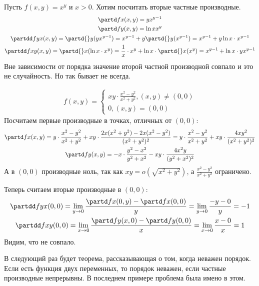 \begin{exmp}
  Пусть $f(x, y) = x^y$ и $x>0$.
  Хотим посчитать вторые частные производные.
	\begin{gather*}
	\partd f x (x, y) = yx^{y-1} \\
	\partd f y (x, y) = \ln x x^y \\
	\partdd f y x (x, y) = \partd{}y(yx^{y-1}) = x^{y-1}+y\partd{}y(x^{y-1}) = x^{y-1}+y\ln x \cdot x^{y-1} \\
	\partdd f x y (x, y) = \partd{}x(\ln x \cdot x^y) = \frac 1 x \cdot x^y + \ln x \cdot \partd{}x(x^y) = x^{y-1}+\ln x \cdot yx^{y-1}
	\end{gather*}
	Вне зависимости от порядка значение второй частной производной совпало и это не случайность.
	Но так бывает не всегда.
\end{exmp}
\begin{exmp}
	\begin{gather*}
	f(x, y) =
		\begin{cases}
			xy \cdot \frac{x^2-y^2}{x^2+y^2}, (x, y) \ne (0, 0) \\
			0, (x, y) = (0, 0)
		\end{cases}
	\end{gather*}
	Посчитаем первые производные в точках, отличных от $(0, 0)$:
	\begin{gather*}
	\partd f x (x, y) = y \cdot \frac{x^2-y^2}{x^2+y^2} + xy \cdot \frac{2x(x^2+y^2)-2x(x^2-y^2)}{(x^2+y^2)^2}
	                  = y \cdot \frac{x^2-y^2}{x^2+y^2} + xy \cdot \frac{4xy^2}{(x^2+y^2)^2} \\
	\partd f y (x, y) = -x \cdot \frac{y^2-x^2}{y^2+x^2} - xy \cdot \frac{4x^2y}{(y^2+x^2)^2}
	\end{gather*}
	А в $(0, 0)$ производные ноль, так как $xy=o(\sqrt{x^2+y^2})$, а $\frac{x^2-y^2}{x^2+y^2}$ ограничено.

	Теперь считаем вторые производные в $(0, 0)$:
	\begin{gather*}
	\partdd f y x (0, 0) = \lim_{y\to 0} \frac{\partd f x (0, y) - \partd f x (0, 0)}{y}
	                     = \lim_{y\to 0} \frac{-y - 0}{y} = -1 \\
	\partdd f x y (0, 0) = \lim_{x\to 0} \frac{\partd f y (x, 0) - \partd f y (0, 0)}{x}
	                     = \lim_{x\to 0} \frac{x - 0}{x} = 1 \\
	\end{gather*}
	Видим, что не совпало.
\end{exmp}
\begin{Rem}
	В следующий раз будет теорема, рассказывающая о том, когда неважен порядок.
	Если есть функция двух переменных, то порядок неважен, если частные производные непрерывны.
	В последнем примере проблема была имено в этом.
\end{Rem}

